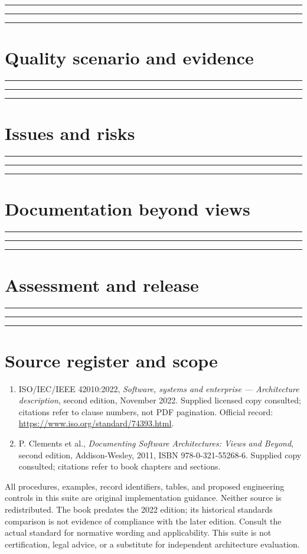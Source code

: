 \documentclass[11pt,letterpaper]{article}
\newcommand{\docsection}[1]{\Needspace{5\baselineskip}\section{#1}}
\begin{document}
\noindent\rule{\linewidth}{0.35pt}\par\vspace{0.7em}
\noindent\rule{\linewidth}{0.35pt}\par\vspace{0.7em}
\noindent\rule{\linewidth}{0.35pt}\par\vspace{0.7em}
\docsection{Quality scenario and evidence}
\noindent\rule{\linewidth}{0.35pt}\par\vspace{0.7em}
\noindent\rule{\linewidth}{0.35pt}\par\vspace{0.7em}
\noindent\rule{\linewidth}{0.35pt}\par\vspace{0.7em}
\docsection{Issues and risks}
\noindent\rule{\linewidth}{0.35pt}\par\vspace{0.7em}
\noindent\rule{\linewidth}{0.35pt}\par\vspace{0.7em}
\noindent\rule{\linewidth}{0.35pt}\par\vspace{0.7em}
\docsection{Documentation beyond views}
\noindent\rule{\linewidth}{0.35pt}\par\vspace{0.7em}
\noindent\rule{\linewidth}{0.35pt}\par\vspace{0.7em}
\noindent\rule{\linewidth}{0.35pt}\par\vspace{0.7em}
\docsection{Assessment and release}
\noindent\rule{\linewidth}{0.35pt}\par\vspace{0.7em}
\noindent\rule{\linewidth}{0.35pt}\par\vspace{0.7em}
\noindent\rule{\linewidth}{0.35pt}\par\vspace{0.7em}
\docsection{Source register and scope}
\begin{enumerate}
\item ISO/IEC/IEEE 42010:2022, \emph{Software, systems and enterprise --- Architecture description}, second edition, November 2022. Supplied licensed copy consulted; citations refer to clause numbers, not PDF pagination. Official record: \url{https://www.iso.org/standard/74393.html}.
\item P. Clements et al., \emph{Documenting Software Architectures: Views and Beyond}, second edition, Addison-Wesley, 2011, ISBN 978-0-321-55268-6. Supplied copy consulted; citations refer to book chapters and sections.
\end{enumerate}
All procedures, examples, record identifiers, tables, and proposed engineering controls in this suite are original implementation guidance. Neither source is redistributed. The book predates the 2022 edition; its historical standards comparison is not evidence of compliance with the later edition. Consult the actual standard for normative wording and applicability. This suite is not certification, legal advice, or a substitute for independent architecture evaluation.
\end{document}
